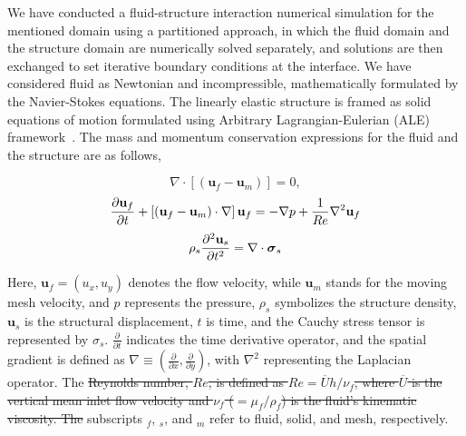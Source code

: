 \documentclass[reprint,a4paper,fleqn]{cas-dc} %
\providecommand{\DIFdel}[1]{{\protect\color{red}\sout{#1}}}                      %
\providecommand{\DIFdelbegin}{} %
\providecommand{\DIFdelend}{} %
\begin{document}
	We have conducted a fluid-structure interaction numerical simulation for the mentioned domain using a partitioned approach, in which the fluid domain and the structure domain are numerically solved separately, and solutions are then exchanged to set iterative boundary conditions at the interface. We have considered fluid as Newtonian and incompressible, mathematically formulated by the Navier-Stokes equations. The linearly elastic structure is framed as solid equations of motion formulated using Arbitrary Lagrangian-Eulerian (ALE) framework~\cite{Nguyen2010, Slone2002, CampbellPaterson2011}. The mass and momentum conservation expressions for the fluid and the structure are as follows,
	\begin{center}\vspace{-0.5cm}
		\begin{equation}
			\nabla\cdot\left[(\mathbf{u}_f-\mathbf{u}_m)\right] = 0,
		\end{equation}
		\begin{equation}
			{\partial\mathbf{u}_f\over\partial t} + \left[(\mathbf{u}_f-\mathbf{u}_m) \cdot\mathbf{\nabla}\right]\mathbf{u}_f = -\nabla p+\frac{1}{Re}\nabla^2\mathbf{u}_f
		\end{equation}
		\begin{equation}
			\rho_s{\partial^2\mathbf{u}_s\over\partial t^2} = \mathbf{\nabla}\cdot\mathbf{\boldsymbol{\sigma}}_s
		\end{equation}
	\end{center}

	Here, $\mathbf{u}_f=(u_x,u_y)$ denotes the flow velocity, while $\mathbf{u}_m$ stands for the moving mesh velocity, and $p$ represents the pressure, $\rho_s$ symbolizes the structure density, $\mathbf{u}_s$ is the structural displacement, $t$ is time, and the Cauchy stress tensor is represented by $\sigma_s$. $\frac{\partial}{\partial t}$ indicates the time derivative operator, and the spatial gradient is defined as $\nabla\equiv\left(\frac{\partial}{\partial x},\frac{\partial}{\partial y}\right)$, with $\nabla^2$ representing the Laplacian operator.  The \DIFdelbegin \DIFdel{Reynolds number, $Re$, is defined as $Re=\overline{U}h/\nu_f$, where $\overline{U}$ is the vertical mean inlet flow velocity and $\nu_f$ ($=\mu_f/\rho_f$) is the fluid's kinematic viscosity. The }\DIFdelend subscripts $_f$, $_s$, and $_m$ refer to fluid, solid, and mesh, respectively.
\end{document}
